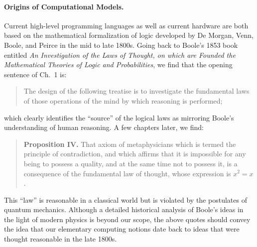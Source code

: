 \documentclass{article}
\begin{document}
\paragraph*{Origins of Computational Models.}
Current high-level programming languages as well as current hardware
are both based on the mathematical formalization of logic developed by
De Morgan, Venn, Boole, and Peirce in the mid to late 1800s. Going
back to Boole's 1853 book entitled \emph{An Investigation of the Laws
  of Thought, on which are Founded the Mathematical Theories of Logic
  and Probabilities}, we find that the opening sentence of Ch.~1 is:
\begin{quote}
  The design of the following treatise is to investigate the fundamental laws
  of those operations of the mind by which reasoning is performed; 
\end{quote}
which clearly identifies the ``source'' of the logical laws as
mirroring Boole's understanding of human reasoning. A few chapters
later, we find:
\begin{quote}
  \textbf{Proposition IV.}  That axiom of metaphysicians which is termed the
  principle of contradiction, and which affirms that it is impossible for any
  being to possess a quality, and at the same time not to possess it, is a
  consequence of the fundamental law of thought, whose expression is $x^2 =
  x$.
\end{quote}
This ``law'' is reasonable in a classical world but is violated by the
postulates of quantum mechanics. Although a detailed historical
analysis of Boole's ideas in the light of modern physics is beyond our
scope, the above quotes should convey the idea that our elementary
computing notions date back to ideas that were thought reasonable in
the late 1800s. 
\end{document}
